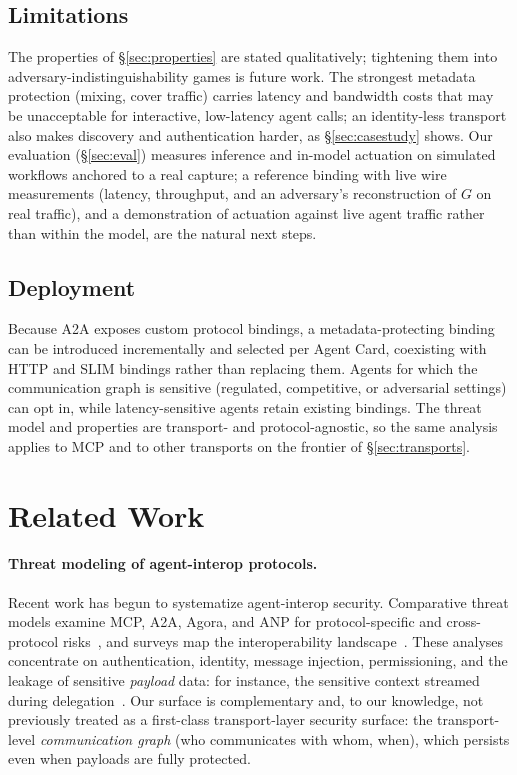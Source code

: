 \documentclass[10pt,twocolumn]{article}
\theoremstyle{definition}
\begin{document}
\subsection{Limitations}
The properties of \S\ref{sec:properties} are stated qualitatively; tightening them
into adversary-indistinguishability games is future work. The strongest metadata
protection (mixing, cover traffic) carries latency and bandwidth costs that may be
unacceptable for interactive, low-latency agent calls; an identity-less transport
also makes discovery and authentication harder, as \S\ref{sec:casestudy} shows.
Our evaluation (\S\ref{sec:eval}) measures inference and in-model actuation on
simulated workflows anchored to a real capture; a reference binding with live wire
measurements (latency, throughput, and an adversary's reconstruction of $G$ on real
traffic), and a demonstration of actuation against live agent traffic rather than
within the model, are the natural next steps.

\subsection{Deployment}
Because A2A exposes custom protocol bindings, a metadata-protecting binding can be
introduced incrementally and selected per Agent Card, coexisting with HTTP and SLIM
bindings rather than replacing them. Agents for which the communication graph is
sensitive (regulated, competitive, or adversarial settings) can opt in, while
latency-sensitive agents retain existing bindings. The threat model and properties
are transport- and protocol-agnostic, so the same analysis applies to MCP and to
other transports on the frontier of \S\ref{sec:transports}.

\section{Related Work}\label{sec:related}

\paragraph{Threat modeling of agent-interop protocols.}
Recent work has begun to systematize agent-interop security. Comparative threat
models examine MCP, A2A, Agora, and ANP for protocol-specific and cross-protocol
risks~\citep{threatmodel2026, secanalysis2025}, and surveys map the
interoperability landscape~\citep{survey2025}. These analyses concentrate on
authentication, identity, message injection, permissioning, and the leakage of
sensitive \emph{payload} data: for instance, the sensitive context streamed during
delegation~\citep{a2adata}. Our surface is
complementary
and, to our knowledge, not previously treated as a first-class transport-layer
security surface: the transport-level \emph{communication graph} (who communicates
with whom, when), which persists even when payloads are fully protected.
\end{document}
